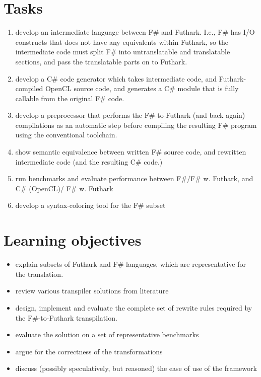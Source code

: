 \documentclass{article}
\begin{document}
\section{Tasks}
\begin{enumerate}
    \item develop an intermediate language between F\# and Futhark.
    I.e., F\# has I/O constructs that does not have any equivalents within 
    Futhark, so the intermediate code must split F\# into untranslatable and
    translatable sections, and pass the translatable parts on to Futhark.

    \item develop a C\# code generator which takes intermediate code, and
      Futhark-compiled OpenCL source code, and generates a C\# module that is
      fully callable from the original F\# code.

    \item develop a preprocessor that performs the F\#-to-Futhark (and back
      again) compilations as an automatic step before compiling the resulting
      F\# program using the conventional toolchain.
    
    \item show semantic equivalence between written F\# source code,
      and rewritten intermediate code (and the resulting C\# code.)

    \item run benchmarks and evaluate performance between F\#/F\# w. Futhark, and 
      C\# (OpenCL)/ F\# w. Futhark

    \item develop a syntax-coloring tool for the F\# subset
\end{enumerate}

\section{Learning objectives}
\begin{itemize}
    \item explain subsets of Futhark and F\# languages, which are representative 
            for the translation.
    \item review various transpiler solutions from literature
    \item design, implement and evaluate the complete set of rewrite 
            rules required by the F\#-to-Futhark transpilation.
    \item evaluate the solution on a set of representative benchmarks
    \item argue for the correctness of the transformations
    \item discuss (possibly speculatively, but reasoned) the ease of use of the framework
\end{itemize}



\end{document}
